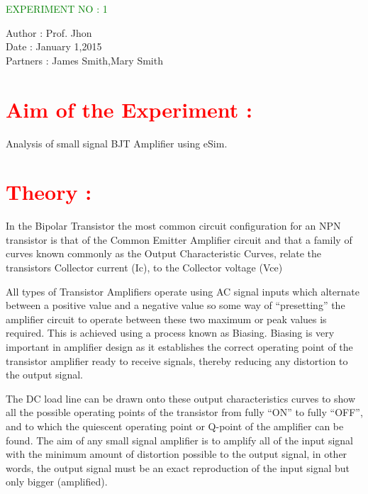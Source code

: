 \documentclass{article}
\begin{document}
\begin{center}
    \LARGE \textcolor{green}{EXPERIMENT NO : 1}
             
\end{center}

    Author   : Prof. Jhon\\
    Date     : January 1,2015\\
    Partners : James Smith,Mary Smith\\


\section*{\textcolor{red}{Aim of the Experiment :}}

Analysis of small signal BJT Amplifier using eSim.
    

\section*{\textcolor{red}{Theory :}}
In the Bipolar Transistor the most common circuit configuration for an NPN transistor is that of the
Common Emitter Amplifier circuit and that a family of curves known commonly as the Output
Characteristic Curves, relate the transistors Collector current (Ic), to the Collector voltage (Vce)

All types of Transistor Amplifiers operate using AC signal inputs which alternate between a positive
value and a negative value so some way of “presetting” the amplifier circuit to operate between
these two maximum or peak values is required. This is achieved using a process known as Biasing.
Biasing is very important in amplifier design as it establishes the correct operating point of the
transistor amplifier ready to receive signals, thereby reducing any distortion to the output signal. \par 


The DC load line can be drawn onto these output characteristics curves to show all the possible
operating points of the transistor from fully “ON” to fully “OFF”, and to which the quiescent
operating point or Q-point of the amplifier can be found. The aim of any small signal amplifier is to
amplify all of the input signal with the minimum amount of distortion possible to the output signal,
in other words, the output signal must be an exact reproduction of the input signal but only bigger
(amplified). \par 
\end{document}
